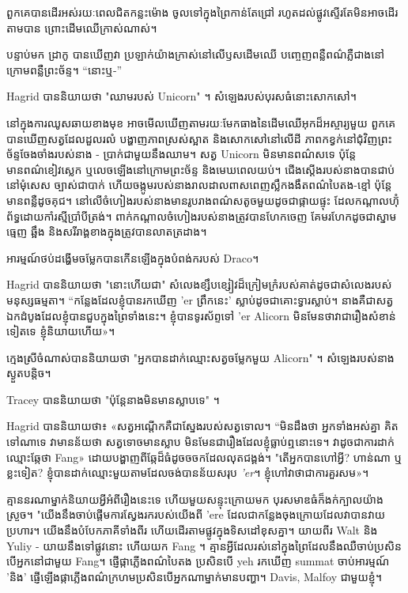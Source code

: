 ពួកគេបានដើរអស់រយៈពេលជិតកន្លះម៉ោង ចូលទៅក្នុងព្រៃកាន់តែជ្រៅ រហូតដល់ផ្លូវស្ទើរតែមិនអាចដើរតាមបាន ព្រោះដើមឈើក្រាស់ណាស់។

បន្ទាប់មក ដ្រាកូ បានឃើញវា ប្រឡាក់យ៉ាងក្រាស់នៅលើឫសដើមឈើ បញ្ចេញពន្លឺពណ៌ភ្លឺជាងនៅក្រោមពន្លឺព្រះច័ន្ទ។ “នោះឬ-”

Hagrid បាននិយាយថា "ឈាមរបស់ Unicorn" ។ សំឡេង​របស់​បុរស​ធំ​នោះ​សោកសៅ។

នៅក្នុងការឈូសឆាយខាងមុខ អាចមើលឃើញតាមរយៈមែកធាងនៃដើមឈើអុកដ៏អស្ចារ្យមួយ ពួកគេបានឃើញសត្វដែលដួលរលំ បង្ហាញភាពស្រស់ស្អាត និងសោកសៅនៅលើដី ភាពកខ្វក់នៅជុំវិញព្រះច័ន្ទចែងចាំងរបស់នាង - ប្រាក់ជាមួយនឹងឈាម។ សត្វ Unicorn មិនមានពណ៌សទេ ប៉ុន្តែមានពណ៌ខៀវស្លេក ឬលេចឡើងនៅក្រោមព្រះច័ន្ទ និងមេឃពេលយប់។ ជើងស្ដើងរបស់នាងបានជាប់នៅមុំសេស ច្បាស់ជាបាក់ ហើយចង្កូមរបស់នាងរាលដាលពាសពេញស្លឹកងងឹតពណ៌បៃតង-ខ្មៅ ប៉ុន្តែមានពន្លឺដូចគុជ។ នៅលើចំហៀងរបស់នាងមានរូបរាងពណ៌សតូចមួយដូចជាផ្កាយផ្ទុះ ដែលកណ្តាលហ៊ុំព័ទ្ធដោយកាំរស្មីប្រាំបីត្រង់។ ពាក់កណ្តាលចំហៀងរបស់នាងត្រូវបានហែកចេញ គែមរហែកដូចជាស្នាមធ្មេញ ឆ្អឹង និងសរីរាង្គខាងក្នុងត្រូវបានលាតត្រដាង។

អារម្មណ៍​ថប់​ដង្ហើម​ចម្លែក​បាន​កើន​ឡើង​ក្នុង​បំពង់ក​របស់ Draco។

Hagrid បាននិយាយថា "នោះហើយជា" សំលេងខ្សឹបខ្សៀវដ៏ក្រៀមក្រំរបស់គាត់ដូចជាសំលេងរបស់មនុស្សធម្មតា។ “កន្លែង​ដែល​ខ្ញុំ​បាន​រក​ឃើញ 'er ព្រឹក​នេះ' ស្លាប់​ដូច​ជា​គោះ​ទ្វារ​ស្លាប់​។ នាង​គឺ​ជា​សត្វ​ឯក​ដំបូង​ដែល​ខ្ញុំ​បាន​ជួប​ក្នុង​ព្រៃ​ទាំង​នេះ។ ខ្ញុំ​បាន​ទូរស័ព្ទ​ទៅ 'er Alicorn មិនមែន​ថា​វា​ជា​រឿង​សំខាន់​ទៀត​ទេ ខ្ញុំ​និយាយ​ហើយ​»។

ក្មេងស្រីចំណាស់បាននិយាយថា "អ្នកបានដាក់ឈ្មោះសត្វចម្លែកមួយ Alicorn" ។ សំឡេងរបស់នាងស្ងួតបន្តិច។

Tracey បាននិយាយថា "ប៉ុន្តែនាងមិនមានស្លាបទេ" ។

Hagrid បាន​និយាយ​ថា​៖ «​សត្វ​អណ្តើក​គឺជា​ស្នែង​របស់​សត្វ​ទោល​។ “មិនដឹងថា អ្នកទាំងអស់គ្នា គិតទៅណាទេ វាមានន័យថា សត្វទោចមានស្លាប មិនមែនជារឿងដែលខ្ញុំធ្លាប់ឮនោះទេ។ វា​ដូច​ជា​ការ​ដាក់​ឈ្មោះ​ឆ្កែ​ថា Fang» ដោយ​បង្ហាញ​ពី​ឆ្កែ​ដ៏​ធំ​ដូច​ចចក​ដែល​លុត​ជង្គង់។ "តើអ្នកបានហៅអ្វី? ហាន់ណា ឬខ្លះទៀត? ខ្ញុំ​បាន​ដាក់​ឈ្មោះ​មួយ​តាម​ដែល​ចង់​បាន​ន័យ​សរុប \emph{'er}។ ខ្ញុំ​ហៅ​វា​ថា​ជា​ការ​គួរសម»។

គ្មាននរណាម្នាក់និយាយអ្វីអំពីរឿងនេះទេ ហើយមួយសន្ទុះក្រោយមក បុរសមាឌធំក៏ងក់ក្បាលយ៉ាងស្រួច។ "យើងនឹងចាប់ផ្តើមការស្វែងរករបស់យើងពី 'ere ដែលជាកន្លែងចុងក្រោយដែលវាបានវាយប្រហារ។ យើង​នឹង​បំបែក​ភាគី​ទាំង​ពីរ ហើយ​ដើរ​តាម​ផ្លូវ​ក្នុង​ទិសដៅ​ខុស​គ្នា។ យាយពីរ Walt និង Yuliy - យាយនឹងទៅផ្លូវនោះ ហើយយក Fang ។ គ្មាន​អ្វី​ដែល​រស់​នៅ​ក្នុង​ព្រៃ​ដែល​នឹង​ឈឺ​ចាប់​ប្រសិន​បើ​អ្នក​នៅ​ជាមួយ Fang។ ផ្ញើផ្កាភ្លើងពណ៌បៃតង ប្រសិនបើ yeh រកឃើញ summat ចាប់អារម្មណ៍ 'និង' ផ្ញើឡើងផ្កាភ្លើងពណ៌ក្រហមប្រសិនបើអ្នកណាម្នាក់មានបញ្ហា។ Davis, Malfoy ជាមួយខ្ញុំ។

